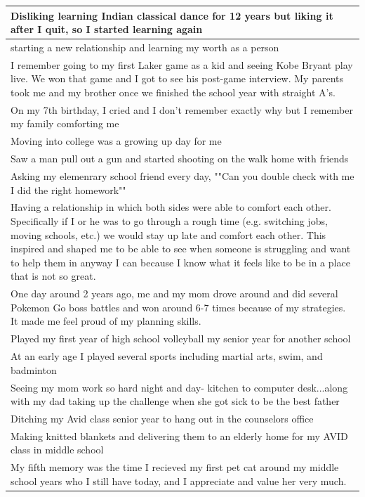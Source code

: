 \documentclass[
  .7em,
  letterpaper,
  DIV=11,
  numbers=noendperiod]{scrartcl}
\begin{document}
\begin{table}
\begin{tabular}{l}
\hline
Disliking learning Indian classical dance for 12 years but liking it after I quit, so I started learning again\\
\hline
starting a new relationship and learning my worth as a person\\
\hline
I remember going to my first Laker game as a kid and seeing Kobe Bryant play live. We won that game and I got to see his post-game interview. My parents took me and my brother once we finished the school year with straight A's.\\
\hline
On my 7th birthday, I cried and I don't remember exactly why but I remember my family comforting me\\
\hline
Moving into college was a growing up day for me\\
\hline
Saw a man pull out a gun and started shooting on the walk home with friends\\
\hline
Asking my elemenrary school friend every day, ""Can you double check with me I did the right homework""\\
\hline
Having a relationship in which both sides were able to comfort each other. Specifically if I or he was to go through a rough time (e.g. switching jobs, moving schools, etc.) we would stay up late and comfort each other. This inspired and shaped me to be able to see when someone is struggling and want to help them in anyway I can because I know what it feels like to be in a place that is not so great.\\
\hline
One day around 2 years ago, me and my mom drove around and did several Pokemon Go boss battles and won around 6-7 times because of my strategies. It made me feel proud of my planning skills.\\
\hline
Played my first year of high school volleyball my senior year for another school\\
\hline
At an early age I played several sports including martial arts, swim, and badminton\\
\hline
Seeing my mom work so hard night and day- kitchen to computer desk...along with my dad taking up the challenge when she got sick to be the best father\\
\hline
Ditching my Avid class senior year to hang out in the counselors office\\
\hline
Making knitted blankets and delivering them to an elderly home for my AVID class in middle school\\
\hline
My fifth memory was the time I recieved my first pet cat around my middle school years who I still have today, and I appreciate and value her very much.\\

\end{tabular}
\end{table}
\end{document}
